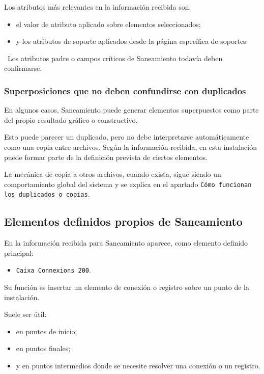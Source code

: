 Los atributos más relevantes en la información recibida son:

\begin{itemize}
\item el valor de atributo aplicado sobre elementos seleccionados;
\item y los atributos de soporte aplicados desde la página específica de soportes.
\end{itemize}

\pendingtag\ Los atributos padre o campos críticos de Saneamiento todavía deben confirmarse.


\subsubsection{Superposiciones que no deben confundirse con duplicados}

En algunos casos, Saneamiento puede generar elementos superpuestos como parte del propio resultado gráfico o constructivo.

Esto puede parecer un duplicado, pero no debe interpretarse automáticamente como una copia entre archivos. Según la información recibida, en esta instalación puede formar parte de la definición prevista de ciertos elementos.

La mecánica de copia a otros archivos, cuando exista, sigue siendo un comportamiento global del sistema y se explica en el apartado \texttt{Cómo funcionan los duplicados o copias}.

\subsection{Elementos definidos propios de Saneamiento}

En la información recibida para Saneamiento aparece, como elemento definido principal:

\begin{itemize}
\item \texttt{Caixa Connexions 200}.
\end{itemize}

Su función es insertar un elemento de conexión o registro sobre un punto de la instalación.

Suele ser útil:

\begin{itemize}
\item en puntos de inicio;
\item en puntos finales;
\item y en puntos intermedios donde se necesite resolver una conexión o un registro.
\end{itemize}

